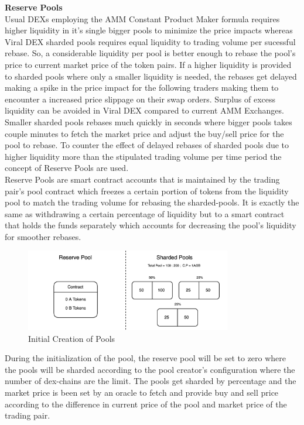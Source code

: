 \documentclass[conference]{IEEEtran}
\begin{document}
\textbf{Reserve Pools}\\

Usual DEXs employing the AMM Constant Product Maker formula requires higher liquidity in it's single bigger pools to minimize the price impacts whereas Viral DEX sharded pools requires equal liquidity to trading volume per sucessful rebase. So, a considerable liquidity per pool is better enough to rebase the pool's price to current market price of the token pairs. If a higher liquidity is provided to sharded pools where only a smaller liquidity is needed, the rebases get delayed making a spike in the price impact for the following traders making them to encounter a increased price slippage on their swap orders. Surplus of excess liquidity can be avoided in Viral DEX compared to current AMM Exchanges. Smaller sharded pools rebases much quickly in seconds where bigger pools takes couple minutes to fetch the market price and adjust the buy/sell price for the pool to rebase. To counter the effect of delayed rebases of sharded pools due to higher liquidity more than the stipulated trading volume per time period the concept of Reserve Pools are used.\\

Reserve Pools are smart contract accounts that is maintained by the trading pair's pool contract which freezes a certain portion of tokens from the liquidity pool to match the trading volume for rebasing the sharded-pools. It is exactly the same as withdrawing a certain percentage of liquidity but to a smart contract that holds the funds separately which accounts for decreasing the pool's liquidity for smoother rebases.\\

\begin{figure}[H]
\begin{center}
\includegraphics[width=9cm]{reserve-pool-1}
\caption{Initial Creation of Pools}
\end{center}
\end{figure}

During the initialization of the pool, the reserve pool will be set to zero where the pools will be sharded according to the pool creator's configuration where the number of dex-chains are the limit. The pools get sharded by percentage and the market price is been set by an oracle to fetch and provide buy and sell price according to the difference in current price of the pool and market price of the trading pair.\\
\end{document}
